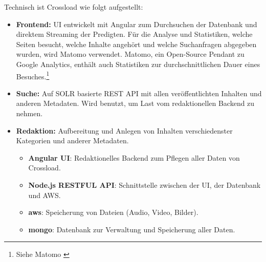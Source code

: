 Technisch ist Crossload wie folgt aufgestellt:
\begin{itemize}
  \item \textbf{Frontend:} UI entwickelt mit Angular zum Durchsuchen der Datenbank und direktem Streaming der Predigten. Für die Analyse und Statistiken, welche Seiten besucht, welche Inhalte angehört und welche Suchanfragen abgegeben wurden, wird Matomo verwendet. Matomo, ein Open-Source Pendant zu Google Analytics, enthält auch Statistiken zur durchschnittlichen Dauer eines Besuches.\footnote{Siehe Matomo \cite{matomo2022}}
  \item \textbf{Suche:} Auf SOLR basierte REST API mit allen veröffentlichten Inhalten und anderen Metadaten. Wird benutzt, um Last vom redaktionellen Backend zu nehmen.
  \item \textbf{Redaktion:} Aufbereitung und Anlegen von Inhalten verschiedenster Kategorien und anderer Metadaten.
  \begin{itemize}
    \item \textbf{Angular UI}: Redaktionelles Backend zum Pflegen aller Daten von Crossload.
    \item \textbf{Node.js RESTFUL API}: Schnittstelle zwischen der UI, der Datenbank und AWS.
    \item \textbf{\gls{aws}}: Speicherung von Dateien (Audio, Video, Bilder).
    \item \textbf{\gls{mongo}}: Datenbank zur Verwaltung und Speicherung aller Daten.
  \end{itemize}
\end{itemize}
